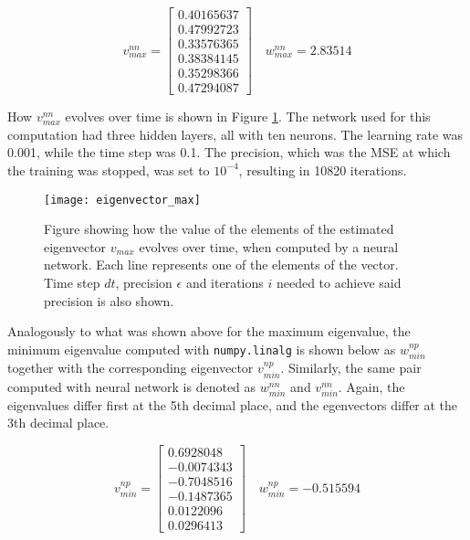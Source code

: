 \begin{equation*}
v_{max}^{nn} = \begin{bmatrix}
	0.40165637 \\
	0.47992723 \\
	0.33576365 \\
	0.38384145 \\
	0.35298366 \\
	0.47294087
\end{bmatrix} \quad w_{max}^{nn} = 2.83514
\end{equation*}

How $v_{max}^{nn}$ evolves over time is shown in Figure \ref{fig:eigenvector_max}. The network used for this computation had three hidden layers, all with ten neurons. The learning rate was 0.001, while the time step was 0.1. The precision, which was the MSE at which the training was stopped, was set to $10^{-4}$, resulting in 10820 iterations.

 \begin{figure}[htbp]
 	\centering
 	\texttt{[image: eigenvector\_max]}
 	\caption{Figure showing how the value of the elements of the estimated eigenvector $v_{max}$ evolves over time, when computed by a neural network. Each line represents one of the elements of the vector. Time step $dt$, precision $\epsilon$ and iterations $i$ needed to achieve said precision is also shown.}
 	\label{fig:eigenvector_max}
 \end{figure}

 Analogously to what was shown above for the maximum eigenvalue, the minimum eigenvalue computed with \texttt{numpy.linalg} is shown below as $w_{min}^{np}$ together with the corresponding eigenvector $v_{min}^{np}$. Similarly, the same pair computed with neural network is denoted as $w_{min}^{nn}$ and $v_{min}^{nn}$. Again, the eigenvalues differ first at the 5th decimal place, and the egenvectors differ at the 3th decimal place.

\begin{equation*}
  v_{min}^{np} = \begin{bmatrix}
   0.6928048 \\
  -0.0074343 \\
  -0.7048516 \\
  -0.1487365 \\
  0.0122096 \\
  0.0296413
  \end{bmatrix} \quad w_{min}^{np} = -0.515594
\end{equation*}


